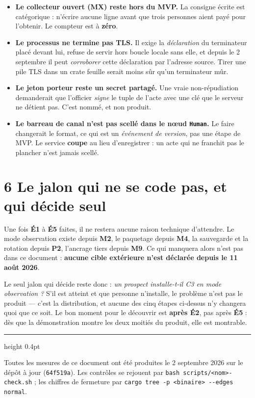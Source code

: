 \documentclass[11pt]{article}
\newcommand{\code}[1]{\texttt{\small #1}}
\newcommand{\pire}[1]{{\color{efered}\textbf{#1}}}
\newcommand{\mm}[1]{\textbf{#1}}
\begin{document}
\begin{itemize}[leftmargin=1.1em,itemsep=1.5pt,topsep=2pt]
\item \textbf{Le collecteur ouvert (\mm{MX}) reste hors du MVP.} La consigne écrite est catégorique :
n'écrire aucune ligne avant que trois personnes aient payé pour l'obtenir. Le compteur est à
\pire{zéro}.
\item \textbf{Le processus ne termine pas TLS.} Il exige la \emph{déclaration} du terminateur placé
devant lui, refuse de servir hors boucle locale sans elle, et depuis le 2 septembre il peut
\emph{corroborer} cette déclaration par l'adresse source. Tirer une pile TLS dans un crate feuille
serait moins sûr qu'un terminateur mûr.
\item \textbf{Le jeton porteur reste un secret partagé.} Une vraie non-répudiation demanderait que
l'officier \emph{signe} le tuple de l'acte avec une clé que le serveur ne détient pas. C'est nommé,
et non produit.
\item \textbf{Le barreau de canal n'est pas scellé dans le nœud \code{Human}.} Le faire changerait le
format, ce qui est un \emph{événement de version}, pas une étape de MVP. Le service \textbf{coupe} au
lieu d'enregistrer : un acte qui ne franchit pas le plancher n'est jamais scellé.
\end{itemize}

\section{6 \;\textbar\; Le jalon qui ne se code pas, et qui décide seul}

\begin{cadre}
Une fois \mm{É1} à \mm{É5} faites, il ne restera aucune raison technique d'attendre. Le mode
observation existe depuis \mm{M2}, le paquetage depuis \mm{M4}, la sauvegarde et la rotation depuis
\mm{P2}, l'ancrage tiers depuis \mm{M9}. Ce qui manquera alors n'est pas dans ce document :
\textbf{aucune cible extérieure n'est déclarée depuis le 11 août 2026}.

Le seul jalon qui décide reste donc : \emph{un prospect installe-t-il C3 en mode observation ?} S'il
est atteint et que personne n'installe, le problème n'est pas le produit --- c'est la distribution, et
aucune des cinq étapes ci-dessus n'y changera quoi que ce soit. Le bon moment pour le découvrir est
\textbf{après \mm{É2}}, pas après \mm{É5} : dès que la démonstration montre les deux moitiés du
produit, elle est montrable.
\end{cadre}

\vspace{4pt}
{\color{efegray}\hrule height 0.4pt}
\vspace{2.5pt}
{\footnotesize\color{efegray}Toutes les mesures de ce document ont été produites le 2 septembre 2026
sur le dépôt à jour (\code{64f519a}). Les contrôles se rejouent par
\code{bash scripts/<nom>-check.sh} ; les chiffres de fermeture par
\code{cargo tree -p <binaire> -{}-edges normal}.}
\end{document}
